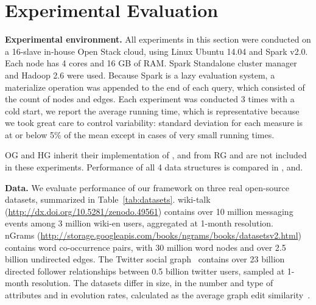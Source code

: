\section{Experimental Evaluation}
\label{sec:exp}

{\bf Experimental environment.} All experiments in this section were
conducted on a 16-slave in-house Open Stack cloud, using Linux Ubuntu
14.04 and Spark v2.0.  Each node has 4 cores and 16 GB of RAM.  Spark
Standalone cluster manager and Hadoop 2.6 were used.
%
Because Spark is a lazy evaluation system, a materialize operation was
appended to the end of each query, which consisted of the count of
nodes and edges.  Each experiment was conducted 3 times with a cold
start, we report the average running time, which is representative
because we took great care to control variability: standard deviation
for each measure is at or below 5\% of the mean except in cases of
very small running times.

OG and HG inherit their implementation of , 
and  from RG and are not included in these
experiments.  Performance of all 4 data structures is compared in
,  and.

{\bf Data.}  We evaluate performance of our framework on three real
open-source datasets, summarized in Table~\ref{tab:datasets}.
wiki-talk (\url{http://dx.doi.org/10.5281/zenodo.49561}) contains over
10 million messaging events among 3 million wiki-en users, aggregated at 1-month resolution.\\nGrams
(\url{http://storage.googleapis.com/books/ngrams/books/datasetsv2.html})
contains word co-occurrence pairs, with
30 million word nodes and over 2.5 billion undirected edges.  The
Twitter social graph~\cite{Gabielkov:2014:SSN:2591971.2591985}
contains over 23 billion directed follower relationships between 0.5
billion twitter users, sampled at 1-month
resolution. The datasets differ in size, in the number
and type of attributes and in evolution rates, calculated as the
average graph edit similarity~\cite{Ren2011}. 

